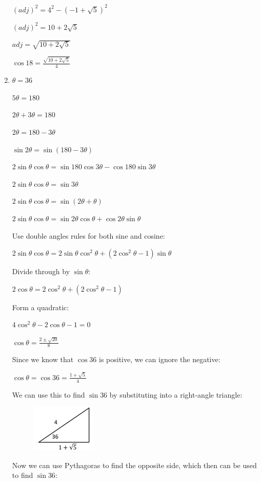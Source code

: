 \documentclass[../main.tex]{subfiles}
\begin{document}
\begin{enumerate}[itemsep=0.4cm]
    $(adj)^2=4^2-(-1+\sqrt{5})^2$

    $(adj)^2=10+2\sqrt{5}$

    $adj=\sqrt{10+2\sqrt{5}}$

    $\cos{18}=\frac{\sqrt{10+2\sqrt{5}}}{4}$

    \item 
    $\theta = 36$

    $5\theta = 180$

    $2\theta + 3\theta = 180$

    $2\theta = 180 - 3\theta$

    $\sin{2\theta} = \sin{(180-3\theta)}$

    $2\sin{\theta}\cos{\theta}=\sin{180}\cos{3\theta}-\cos{180}\sin{3\theta}$

    $2\sin{\theta}\cos{\theta}=\sin{3\theta}$

    $2\sin{\theta}\cos{\theta}=\sin{(2\theta+\theta)}$

    $2\sin{\theta}\cos{\theta}=\sin{2\theta}\cos{\theta}+\cos{2\theta}\sin{\theta}$

    Use double angles rules for both sine and cosine:

    $2\sin{\theta}\cos{\theta}=2\sin{\theta}\cos^2{\theta}+(2\cos^2{\theta}-1)\sin{\theta}$

    Divide through by $\sin{\theta}$:

    $2\cos{\theta}=2\cos^2{\theta}+(2\cos^2{\theta}-1)$

    Form a quadratic:

    $4\cos^2{\theta}-2\cos{\theta}-1=0$

    $\cos{\theta}=\frac{2\pm \sqrt{20}}{8}$

    Since we know that $\cos{36}$ is positive, we can ignore the negative:

    $\cos{\theta}=\cos{36}=\frac{1+\sqrt{5}}{4}$

    We can use this to find $\sin{36}$ by substituting into a right-angle triangle:

    \begin{figure}[h]
        \centering
        \includegraphics[width=0.15\linewidth]{images/exacttrigvalues.png}
    \end{figure}

    Now we can use Pythagoras to find the opposite side, which then can be used to find $\sin{36}$:


\end{enumerate}
\end{document}
